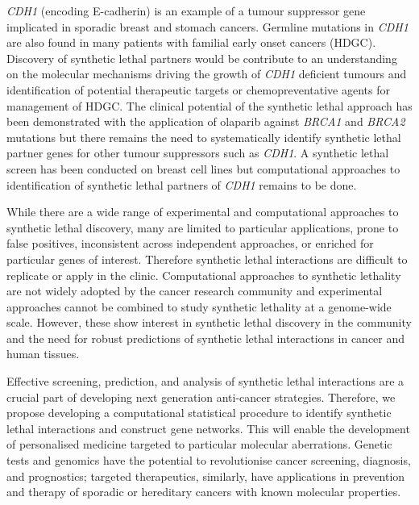 \textit{CDH1} (encoding E-cadherin) is an example of a tumour suppressor gene implicated in sporadic breast and stomach cancers. Germline mutations in \textit{CDH1} are also found in many patients with familial early onset cancers (HDGC). Discovery of synthetic lethal partners would be contribute to an understanding on the molecular mechanisms driving the growth of \textit{CDH1} deficient tumours and identification of potential therapeutic targets or chemopreventative agents for management of HDGC. The clinical potential of the synthetic lethal approach has been demonstrated with the application of olaparib against \textit{BRCA1} and \textit{BRCA2} mutations \citet{Lord2014} but there remains the need to systematically identify synthetic lethal partner genes for other tumour suppressors such as \textit{CDH1}. A synthetic lethal screen has been conducted on breast cell lines \citet{Telford2015} but computational approaches to identification of synthetic lethal partners of \textit{CDH1} remains to be done.  


While there are a wide range of experimental and computational approaches to synthetic lethal discovery, many are limited to particular applications, prone to false positives, inconsistent across independent approaches, or enriched for particular genes of interest. Therefore synthetic lethal interactions are difficult to replicate or apply in the clinic. Computational approaches to synthetic lethality are not widely adopted by the cancer research community and experimental approaches cannot be combined to study synthetic lethality at a genome-wide scale. However, these show interest in synthetic lethal discovery in the community and the need for robust predictions of synthetic lethal interactions in cancer and human tissues.

Effective screening, prediction, and analysis of synthetic lethal interactions are a crucial part of developing next generation anti-cancer strategies. Therefore, we propose developing a computational statistical procedure to identify synthetic lethal interactions and construct gene networks. This will enable the development of personalised medicine targeted to particular molecular aberrations. Genetic tests and genomics have the potential to revolutionise cancer screening, diagnosis, and prognostics; targeted therapeutics, similarly, have applications in prevention and therapy of sporadic or hereditary cancers with known molecular properties.

